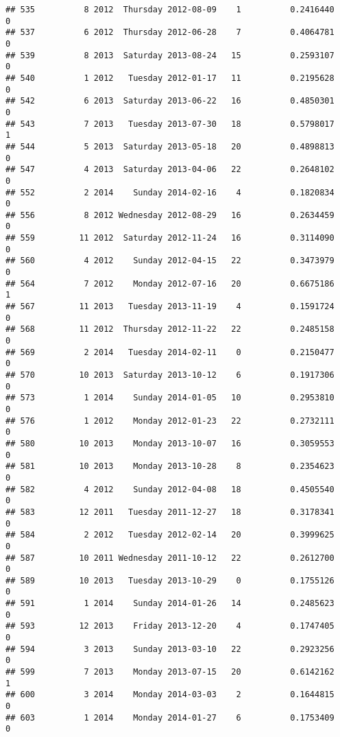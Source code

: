 \documentclass[
]{article}
\begin{document}
\begin{verbatim}
## 535          8 2012  Thursday 2012-08-09    1          0.2416440             0
## 537          6 2012  Thursday 2012-06-28    7          0.4064781             0
## 539          8 2013  Saturday 2013-08-24   15          0.2593107             0
## 540          1 2012   Tuesday 2012-01-17   11          0.2195628             0
## 542          6 2013  Saturday 2013-06-22   16          0.4850301             0
## 543          7 2013   Tuesday 2013-07-30   18          0.5798017             1
## 544          5 2013  Saturday 2013-05-18   20          0.4898813             0
## 547          4 2013  Saturday 2013-04-06   22          0.2648102             0
## 552          2 2014    Sunday 2014-02-16    4          0.1820834             0
## 556          8 2012 Wednesday 2012-08-29   16          0.2634459             0
## 559         11 2012  Saturday 2012-11-24   16          0.3114090             0
## 560          4 2012    Sunday 2012-04-15   22          0.3473979             0
## 564          7 2012    Monday 2012-07-16   20          0.6675186             1
## 567         11 2013   Tuesday 2013-11-19    4          0.1591724             0
## 568         11 2012  Thursday 2012-11-22   22          0.2485158             0
## 569          2 2014   Tuesday 2014-02-11    0          0.2150477             0
## 570         10 2013  Saturday 2013-10-12    6          0.1917306             0
## 573          1 2014    Sunday 2014-01-05   10          0.2953810             0
## 576          1 2012    Monday 2012-01-23   22          0.2732111             0
## 580         10 2013    Monday 2013-10-07   16          0.3059553             0
## 581         10 2013    Monday 2013-10-28    8          0.2354623             0
## 582          4 2012    Sunday 2012-04-08   18          0.4505540             0
## 583         12 2011   Tuesday 2011-12-27   18          0.3178341             0
## 584          2 2012   Tuesday 2012-02-14   20          0.3999625             0
## 587         10 2011 Wednesday 2011-10-12   22          0.2612700             0
## 589         10 2013   Tuesday 2013-10-29    0          0.1755126             0
## 591          1 2014    Sunday 2014-01-26   14          0.2485623             0
## 593         12 2013    Friday 2013-12-20    4          0.1747405             0
## 594          3 2013    Sunday 2013-03-10   22          0.2923256             0
## 599          7 2013    Monday 2013-07-15   20          0.6142162             1
## 600          3 2014    Monday 2014-03-03    2          0.1644815             0
## 603          1 2014    Monday 2014-01-27    6          0.1753409             0

\end{verbatim}
\end{document}
